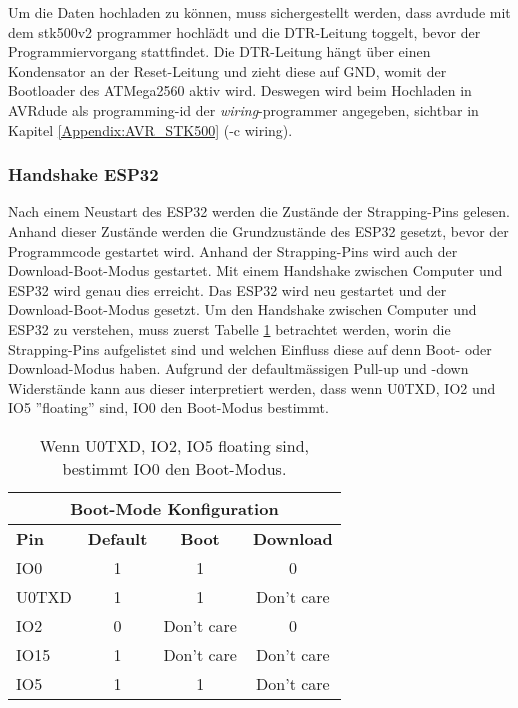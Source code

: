 Um die Daten hochladen zu können, muss sichergestellt werden, dass avrdude mit dem stk500v2 programmer hochlädt und die DTR-Leitung toggelt, bevor der Programmiervorgang stattfindet. Die DTR-Leitung hängt über einen Kondensator an der Reset-Leitung und zieht diese auf GND, womit der Bootloader des ATMega2560 aktiv wird. Deswegen wird beim Hochladen in AVRdude als programming-id der \textit{wiring}-programmer angegeben, sichtbar in Kapitel \ref{Appendix:AVR_STK500} (-c wiring).

\subsubsection{Handshake ESP32}\label{subsubsec:Handshake_ESP32}
Nach einem Neustart des ESP32 werden die Zustände der Strapping-Pins gelesen. Anhand dieser Zustände werden die Grundzustände des ESP32 gesetzt, bevor der Programmcode gestartet wird. Anhand der Strapping-Pins wird auch der Download-Boot-Modus gestartet. Mit einem Handshake zwischen Computer und ESP32 wird genau dies erreicht. Das ESP32 wird neu gestartet und der Download-Boot-Modus gesetzt.
Um den Handshake zwischen Computer und ESP32 zu verstehen, muss zuerst Tabelle \ref{tab:Einfluss_Pins_auf_Boot_Modus} betrachtet werden, worin die Strapping-Pins aufgelistet sind und welchen Einfluss diese auf denn Boot- oder Download-Modus haben. Aufgrund der defaultmässigen Pull-up und -down Widerstände kann aus dieser interpretiert werden, dass wenn U0TXD, IO2 und IO5 ''floating'' sind, IO0 den Boot-Modus bestimmt.

\begin{table}[H]
\center
\begin{tabular}{|l|c|c|c|}
\hline
\multicolumn{4}{|c|}{\textbf{Boot-Mode Konfiguration}}\\
\hline
\textbf{Pin} & \textbf{Default} & \textbf{Boot} & \textbf{Download} \\
\hline
IO0 & 1 & 1 & 0 \\
\hline
U0TXD & 1 & 1 & Don't care \\
\hline
IO2 & 0 & Don't care & 0 \\
\hline
IO15 & 1 & Don't care & Don't care \\
\hline
IO5 & 1 & 1 & Don't care \\
\hline
\end{tabular}
\caption{Wenn U0TXD, IO2, IO5 floating sind, bestimmt IO0 den Boot-Modus.}
\label{tab:Einfluss_Pins_auf_Boot_Modus}
\end{table}
